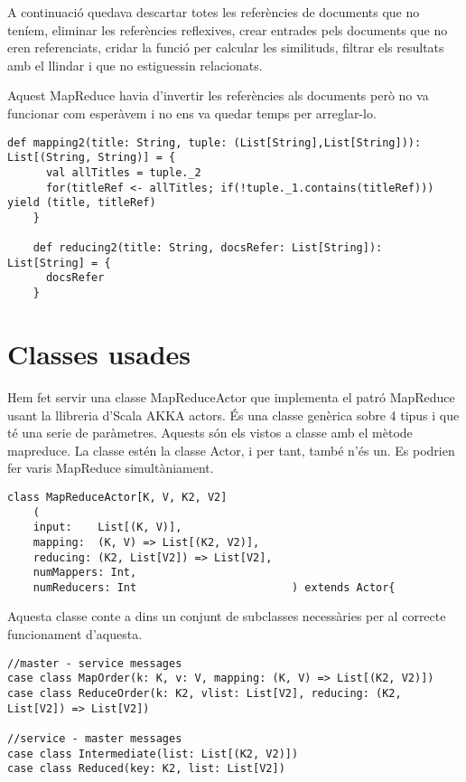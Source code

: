 \documentclass{report}
\begin{document}
A continuació quedava descartar totes les referències de documents que no teníem, eliminar les referències reflexives, crear entrades pels documents que no eren referenciats, cridar la funció per calcular les similituds, filtrar els resultats amb el llindar i que no estiguessin relacionats.


Aquest MapReduce havia d'invertir les referències als documents però no va funcionar com esperàvem i no ens va quedar temps per arreglar-lo.
\begin{lstlisting}[style=scalaHighlight]
    def mapping2(title: String, tuple: (List[String],List[String])): List[(String, String)] = {
      val allTitles = tuple._2
      for(titleRef <- allTitles; if(!tuple._1.contains(titleRef))) yield (title, titleRef)
    }

    def reducing2(title: String, docsRefer: List[String]): List[String] = {
      docsRefer
    }
\end{lstlisting}


\chapter{Classes usades}

Hem fet servir una classe MapReduceActor que implementa el patró MapReduce usant la llibreria d'Scala AKKA actors. És una classe genèrica sobre 4 tipus i que té una serie de paràmetres. Aquests són els vistos a classe amb el mètode mapreduce. La classe estén la classe Actor, i per tant, també n'és un. Es podrien fer varis MapReduce simultàniament.

\begin{lstlisting}[style=scalaHighlight]
class MapReduceActor[K, V, K2, V2]
    (
    input:    List[(K, V)],
    mapping:  (K, V) => List[(K2, V2)],
    reducing: (K2, List[V2]) => List[V2],
    numMappers: Int,
    numReducers: Int                        ) extends Actor{
\end{lstlisting}

Aquesta classe conte a dins un conjunt de subclasses necessàries per al correcte funcionament d'aquesta.

\begin{lstlisting}[style=scalaHighlight]
//master - service messages
case class MapOrder(k: K, v: V, mapping: (K, V) => List[(K2, V2)])
case class ReduceOrder(k: K2, vlist: List[V2], reducing: (K2, List[V2]) => List[V2])

//service - master messages
case class Intermediate(list: List[(K2, V2)])
case class Reduced(key: K2, list: List[V2])
\end{lstlisting}
\end{document}
